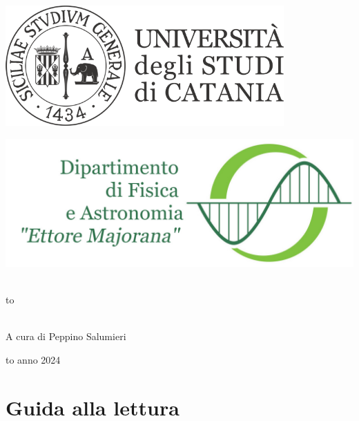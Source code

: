 \documentclass[openany,12pt]{article}
\newcommand\blankpage{%
    \null
    \thispagestyle{empty}%
    \newpage}
\begin{document}
  \thispagestyle{empty}
  \begin{center}

  \begin{minipage}[c]{0.45\textwidth}
  \begin{flushleft}
  \includegraphics[width=0.8\textwidth]{logo-unict-orizzontale-grigio.png}
  \end{flushleft}
  \end{minipage}
  \hfill
  \begin{minipage}[c]{0.45\textwidth}
  \begin{flushright}
  \includegraphics[width=\textwidth]{logo_dfa_orizzontale}
  \end{flushright}
  \end{minipage}\\
  \medskip
  \hbox to \textwidth{\hrulefill}

  \vfill
  \vfill


  \uppercase{}\\

  \vfill
  \large{A cura di Peppino Salumieri}

  \vfill
  \vfill
  \hbox to \textwidth{\hrulefill}
  {\sc anno 2024}
  \end{center}

  \newpage

  \blankpage

  \tableofcontents

  \newpage

  \blankpage

  \section*{Guida alla lettura}
\end{document}
